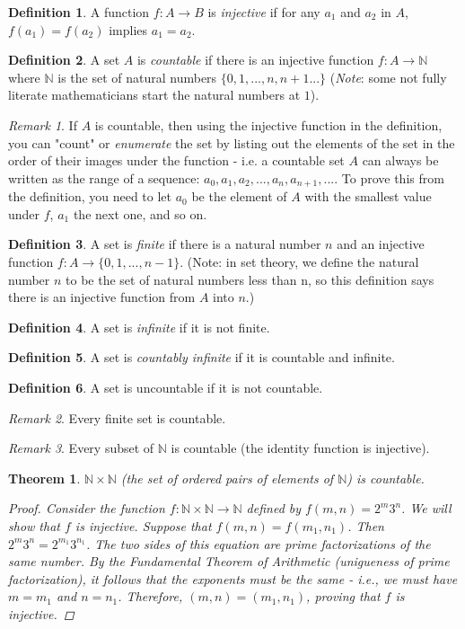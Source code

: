 \documentclass[11pt,a4paper]{report}
\theoremstyle{plain}
\newtheorem{thm}{Theorem}[section]
\theoremstyle{definition}
\newtheorem{defn}{Definition}[section]
\theoremstyle{remark}
\newtheorem*{rem}{Remark}
\begin{document}
\begin{defn}
A function $f \colon A \to B$ is \textit{injective} if for any $a_1$ and $a_2$ in $A$, $f(a_1) = f(a_2)$ implies $a_1 = a_2$.
\end{defn}
\begin{defn}
A set $A$ is \textit{countable} if there is an injective function $f \colon A \to \mathbb{N}$ where $\mathbb{N}$ is the set of natural numbers $\{0, 1, ..., n, n+1 ...\}$ (\textit{Note}: some not fully literate mathematicians start the natural numbers at $1$).
\end{defn}
\begin{rem}
If $A$ is countable, then using the injective function in the definition, you can "count" or \textit{enumerate} the set by listing out the elements of the set in the order of their images under the function - i.e. a countable set $A$ can always be written as the range of a sequence:  $a_0, a_1, a_2, ..., a_n, a_{n+1}, ...$.  To prove this from the definition, you need to let $a_0$ be the element of $A$ with the smallest value under $f$, $a_1$ the next one, and so on.
\end{rem}
\begin{defn}
A set is \textit{finite} if there is a natural number $n$ and an injective function $f \colon A \to \{0, 1, ..., n-1\}$. (Note: in set theory, we define the natural number $n$ to be the set of natural numbers less than n, so this definition says there is an injective function from $A$ into $n$.) 
\end{defn}
\begin{defn}
A set is \textit{infinite} if it is not finite.
\end{defn}
\begin{defn}
A set is \textit{countably infinite} if it is countable and infinite.
\end{defn}
\begin{defn}
A set is uncountable if it is not countable.
\end{defn}
\begin{rem}
Every finite set is countable.
\end{rem}
\begin{rem}
Every subset of $\mathbb{N}$ is countable (the identity function is injective).
\end{rem}
\begin{thm}
$\mathbb{N} \times \mathbb{N}$ (the set of ordered pairs of elements of $\mathbb{N}$) is countable.
\begin{proof}
Consider the function \mbox{$f \colon \mathbb{N} \times \mathbb{N} \to \mathbb{N}$} defined by \mbox{$f(m, n) = 2^{m} 3^{n}$.} We will show that $f$ is injective.  Suppose that $f(m, n) = f(m_1, n_1)$.  Then $2^{m} 3^{n} = 2^{m_1} 3^{n_1}$.  The two sides of this equation are prime factorizations of the same number.  By the Fundamental Theorem of Arithmetic (unigueness of prime factorization), it follows that the exponents must be the same - i.e., we must have $m = m_1$ and $n = n_1$.  Therefore, $(m, n) = (m_1, n_1)$, proving that $f$ is injective.
\end{proof}
\end{thm}
\end{document}

